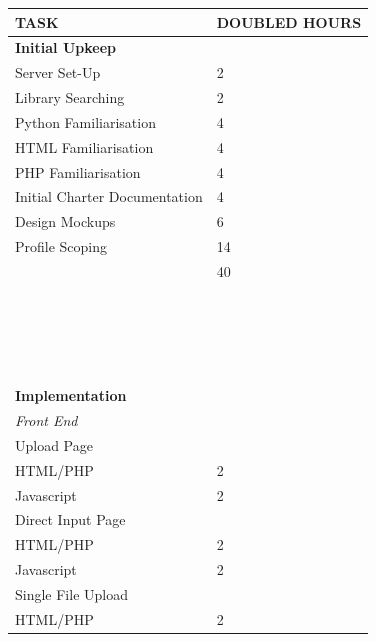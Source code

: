 \documentclass[12pt]{article}
\begin{document}
\begin{longtable}{|l|l|}
    \hline
    {\bf TASK}                           & {\bf DOUBLED HOURS} \\
    \hline
    {\bf Initial Upkeep}                 & ~             \\
    Server Set-Up                        & 2             \\
    Library Searching                    & 2             \\
    Python Familiarisation               & 4             \\
    HTML Familiarisation                 & 4             \\
    PHP Familiarisation                  & 4             \\
    Initial Charter Documentation        & 4             \\
    Design Mockups                       & 6             \\
    Profile Scoping                      & 14            \\
    \hline
    ~                                    & 40            \\
    \hline
    ~                                    & ~             \\
    ~                                    & ~             \\
    ~                                    & ~             \\
    ~                                    & ~             \\
    {\bf Implementation}                 & ~             \\
    {\em Front End}                      & ~             \\
    Upload Page                          & ~             \\
    HTML/PHP                             & 2             \\
    Javascript                           & 2             \\
    Direct Input Page                    & ~             \\
    HTML/PHP                             & 2             \\
    Javascript                           & 2             \\
    Single File Upload                   & ~             \\
    HTML/PHP                             & 2             \\

\end{longtable}
\end{document}
